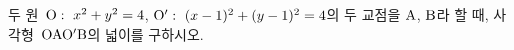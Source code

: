두 원~$\mathrm{O}:\ x^2+y^2=4$, $\mathrm{O}':\ (x-1)^2+(y-1)^2=4$의 두 교점을 $\mathrm{A}$, $\mathrm{B}$라 할 때, 사각형~$\mathrm{OAO'B}$의 넓이를 구하시오. 
